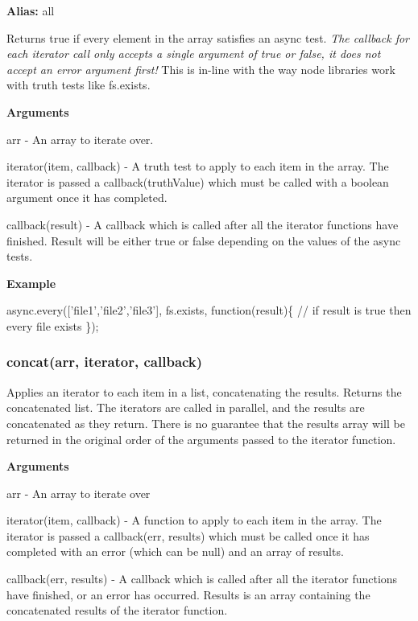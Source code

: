 {\bfseries Alias\+:} all

Returns true if every element in the array satisfies an async test. {\itshape The callback for each iterator call only accepts a single argument of true or false, it does not accept an error argument first!} This is in-\/line with the way node libraries work with truth tests like fs.\+exists.

{\bfseries Arguments}


\begin{DoxyItemize}
\item arr -\/ An array to iterate over.
\item iterator(item, callback) -\/ A truth test to apply to each item in the array. The iterator is passed a callback(truth\+Value) which must be called with a boolean argument once it has completed.
\item callback(result) -\/ A callback which is called after all the iterator functions have finished. Result will be either true or false depending on the values of the async tests.
\end{DoxyItemize}

{\bfseries Example}


\begin{DoxyCode}
async.every(['file1','file2','file3'], fs.exists, function(result)\{
    // if result is true then every file exists
\});
\end{DoxyCode}
 



\label{_concat}%
 \subsubsection*{concat(arr, iterator, callback)}

Applies an iterator to each item in a list, concatenating the results. Returns the concatenated list. The iterators are called in parallel, and the results are concatenated as they return. There is no guarantee that the results array will be returned in the original order of the arguments passed to the iterator function.

{\bfseries Arguments}


\begin{DoxyItemize}
\item arr -\/ An array to iterate over
\item iterator(item, callback) -\/ A function to apply to each item in the array. The iterator is passed a callback(err, results) which must be called once it has completed with an error (which can be null) and an array of results.
\item callback(err, results) -\/ A callback which is called after all the iterator functions have finished, or an error has occurred. Results is an array containing the concatenated results of the iterator function.
\end{DoxyItemize}

